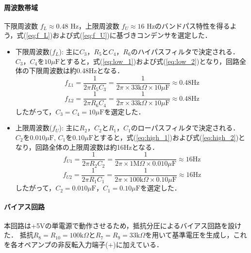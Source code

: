 \paragraph{周波数帯域}
下限周波数 $f_L \approx 0.48$ Hz，上限周波数 $f_U \approx 16$ Hzのバンドパス特性を得るよう，式(\ref{eq:f_L})および式(\ref{eq:f_U})に基づきコンデンサを選定した．
\begin{itemize}
  \item 下限周波数($f_L$): 主に$C_3$，$R_5$と$C_4$，$R_6$のハイパスフィルタで決定される．
  $C_3$，$C_4$を$10\mu\text{F}$とすると，式(\ref{eq:low_1})および式(\ref{eq:low_2})となり，回路全体の下限周波数は約0.48Hzとなる．
  \begin{equation}
    f_{L1} = \frac{1}{2\pi R_5 C_3} = \frac{1}{2\pi \times 33\text{k}\Omega \times 10\mu\text{F}} \approx 0.48 \text{Hz} \label{eq:low_1}
  \end{equation}
  \begin{equation}
    f_{L2} = \frac{1}{2\pi R_6 C_4} = \frac{1}{2\pi \times 33\text{k}\Omega \times 10\mu\text{F}} \approx 0.48 \text{Hz} \label{eq:low_2}
  \end{equation}
  したがって，$C_3=C_4=10\mu\text{F}$を選定した．
  \item 上限周波数($f_U$): 主に$R_2$，$C_2$と$R_1$，$C_1$のローパスフィルタで決定される．
  $C_2$を$0.010\mu\text{F}$, $C_1$を$0.10\mu\text{F}$とすると，式(\ref{eq:high_1})および式(\ref{eq:high_2})となり，回路全体の上限周波数は約16Hzとなる．
  \begin{equation}
    f_{U1} = \frac{1}{2\pi R_2 C_2} = \frac{1}{2\pi \times 1\text{M}\Omega \times 0.010\mu\text{F}} \approx 16 \text{Hz} \label{eq:high_1}
  \end{equation}
  \begin{equation}
    f_{U2} = \frac{1}{2\pi R_1 C_1} = \frac{1}{2\pi \times 100\text{k}\Omega \times 0.10\mu\text{F}} \approx 16 \text{Hz} \label{eq:high_2}
  \end{equation}
  したがって，$C_2=0.010\mu\text{F}$，$C_1=0.10\mu\text{F}$を選定した．
\end{itemize}
    
\paragraph{バイアス回路}
本回路は+5Vの単電源で動作させるため，抵抗分圧によるバイアス回路を設けた．
抵抗$R_8=R_{10}=100\text{k}\Omega$と$R_7=R_9=33\text{k}\Omega$を用いて基準電圧を生成し，これを各オペアンプの非反転入力端子(+)に加えている．


